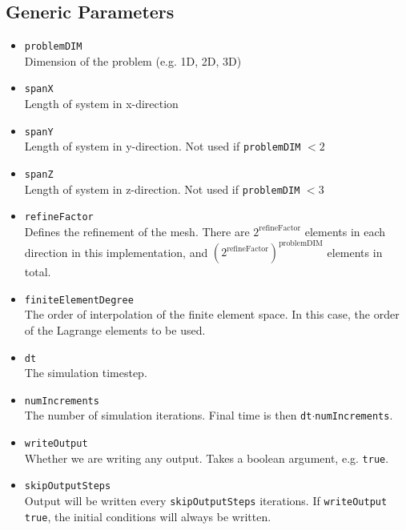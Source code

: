 \documentclass[11pt]{article} %
\begin{document}
\subsection{Generic Parameters}
\begin{itemize}
\item \texttt{problemDIM} \\
	Dimension of the problem (e.g. 1D, 2D, 3D)
\item \texttt{spanX} \\
	Length of system in x-direction
\item \texttt{spanY} \\
	Length of system in y-direction.  Not used if \texttt{problemDIM} $< 2$
\item \texttt{spanZ} \\
	Length of system in z-direction.  Not used if \texttt{problemDIM} $< 3$
\item \texttt{refineFactor} \\
	Defines the refinement of the mesh.  There are $2^{\mathrm{refineFactor}}$ elements in each direction in this implementation, and 						$\left( 2^{\mathrm{refineFactor}} \right)^{\mathrm{problemDIM}}$ elements in total.
\item \texttt{finiteElementDegree} \\
	The order of interpolation of the finite element space.  In this case, the order of the Lagrange elements to be used.
\item \texttt{dt} \\
	The simulation timestep.
\item \texttt{numIncrements} \\
	The number of simulation iterations.  Final time is then \texttt{dt}$\cdot$\texttt{numIncrements}.
\item \texttt{writeOutput} \\
	Whether we are writing any output.  Takes a boolean argument, e.g. \texttt{true}.
\item \texttt{skipOutputSteps} \\
	Output will be written every \texttt{skipOutputSteps} iterations.  If \texttt{writeOutput} \texttt{true}, the initial conditions will always be written.
\end{itemize}

\end{document}

